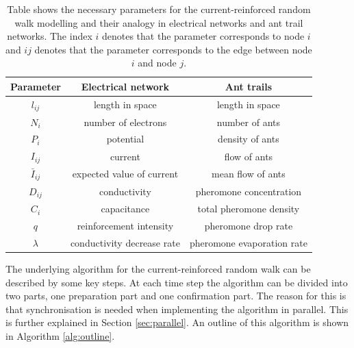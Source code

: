 \begin{table}[H]
\renewcommand{\arraystretch}{1.2}
\centering
\caption{Table shows the necessary parameters for the current-reinforced random walk modelling and their analogy in electrical networks and ant trail networks. The index $i$ denotes that the parameter corresponds to node $i$ and $ij$ denotes that the parameter corresponds to the edge between node $i$ and node $j$.}
\label{tab:parameters}
\begin{tabular}{ c | c | c }                       
	\textbf{Parameter} & \textbf{Electrical network} & \textbf{Ant trails} \\
	\hline
	$l_{ij}$ & length in space & length in space \\
	\hline
	$N_{i}$ & number of electrons & number of ants \\
	\hline	
	$P_{i}$ & potential & density of ants \\	%
	\hline
	$I_{ij}$ & current & flow of ants \\
	\hline
	$\bar{I}_{ij}$ & expected value of current & mean flow of ants \\
	\hline
	$D_{ij}$ & conductivity & pheromone concentration \\
	\hline
	$C_{i}$ & capacitance & total pheromone density \\
	\hline
	$q$ & reinforcement intensity & pheromone drop rate \\
	\hline
	$\lambda$ & conductivity decrease rate & pheromone evaporation rate \\
\end{tabular} 
\end{table}

The underlying algorithm for the current-reinforced random walk can be described by some key steps. At each time step the algorithm can be divided into two parts, one preparation part and one confirmation part. The reason for this is that synchronisation is needed when implementing the algorithm in parallel. This is further explained in Section \ref{sec:parallel}. An outline of this algorithm is shown in Algorithm \ref{alg:outline}.

%

